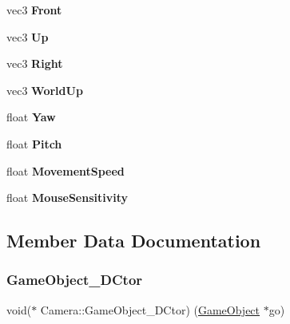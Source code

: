 \begin{DoxyCompactItemize}
\begin{tabbing}
\end{tabbing}\item 
\mbox{\label{struct_camera_ae8fefdb9e27290a00d9c70be77086bc6}} 
vec3 {\bfseries Front}
\item 
\mbox{\label{struct_camera_a17c45b2bf09c165a4cf1aff793f628d7}} 
vec3 {\bfseries Up}
\item 
\mbox{\label{struct_camera_a1c47a3264f5bc15356de0319df40696a}} 
vec3 {\bfseries Right}
\item 
\mbox{\label{struct_camera_a45f586b01107a672129db3381e60e3f0}} 
vec3 {\bfseries World\+Up}
\item 
\mbox{\label{struct_camera_a1a1354a2bd2df7f18ef82924e671d241}} 
float {\bfseries Yaw}
\item 
\mbox{\label{struct_camera_af9c8f223bb06bb74fc77c586545e7e67}} 
float {\bfseries Pitch}
\item 
\mbox{\label{struct_camera_a63221392d762df6a74f45bc9d43a2f61}} 
float {\bfseries Movement\+Speed}
\item 
\mbox{\label{struct_camera_a73e88844b31d5111eeb76327dfbb2d68}} 
float {\bfseries Mouse\+Sensitivity}
\end{DoxyCompactItemize}


\subsection{Member Data Documentation}
\mbox{\label{struct_camera_acdec9e05794ea2771f97316373556a46}} 
\subsubsection{\texorpdfstring{GameObject\_DCtor}{GameObject\_DCtor}}
{\footnotesize\ttfamily void($\ast$ Camera\+::\+Game\+Object\+\_\+\+D\+Ctor) (\mbox{\hyperlink{struct_game_object}{Game\+Object}} $\ast$go)}



